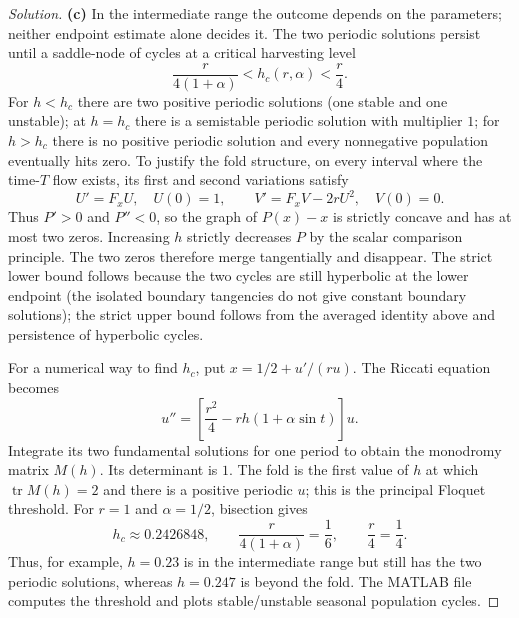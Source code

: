 \documentclass[10pt]{amsart}
\newenvironment{solution}
{\begin{proof}[Solution]}
{\end{proof}}
\begin{document}
\begin{onehalfspace}
\begin{solution}
\textbf{(c)} In the intermediate range the outcome depends on the parameters; neither endpoint estimate alone decides it. The two periodic solutions persist until a saddle-node of cycles at a critical harvesting level
\[
 \frac{r}{4(1+\alpha)}<h_c(r,\alpha)<\frac r4.
\]
For $h<h_c$ there are two positive periodic solutions (one stable and one unstable); at $h=h_c$ there is a semistable periodic solution with multiplier $1$; for $h>h_c$ there is no positive periodic solution and every nonnegative population eventually hits zero. To justify the fold structure, on every interval where the time-$T$ flow exists, its first and second variations satisfy
\[
 U'=F_xU,\quad U(0)=1,\qquad
 V'=F_xV-2rU^2,\quad V(0)=0.
\]
Thus $P'>0$ and $P''<0$, so the graph of $P(x)-x$ is strictly concave and has at most two zeros. Increasing $h$ strictly decreases $P$ by the scalar comparison principle. The two zeros therefore merge tangentially and disappear. The strict lower bound follows because the two cycles are still hyperbolic at the lower endpoint (the isolated boundary tangencies do not give constant boundary solutions); the strict upper bound follows from the averaged identity above and persistence of hyperbolic cycles.

For a numerical way to find $h_c$, put $x=1/2+u'/(ru)$. The Riccati equation becomes
\[
 u''=\left[\frac{r^2}{4}-rh(1+\alpha\sin t)\right]u.
\]
Integrate its two fundamental solutions for one period to obtain the monodromy matrix $M(h)$. Its determinant is $1$. The fold is the first value of $h$ at which $\operatorname{tr}M(h)=2$ and there is a positive periodic $u$; this is the principal Floquet threshold. For $r=1$ and $\alpha=1/2$, bisection gives
\[
 h_c\approx0.2426848,\qquad
 \frac{r}{4(1+\alpha)}=\frac16,\qquad \frac r4=\frac14.
\]
Thus, for example, $h=0.23$ is in the intermediate range but still has the two periodic solutions, whereas $h=0.247$ is beyond the fold. The MATLAB file computes the threshold and plots stable/unstable seasonal population cycles.


\end{solution}
\end{onehalfspace}
\end{document}
